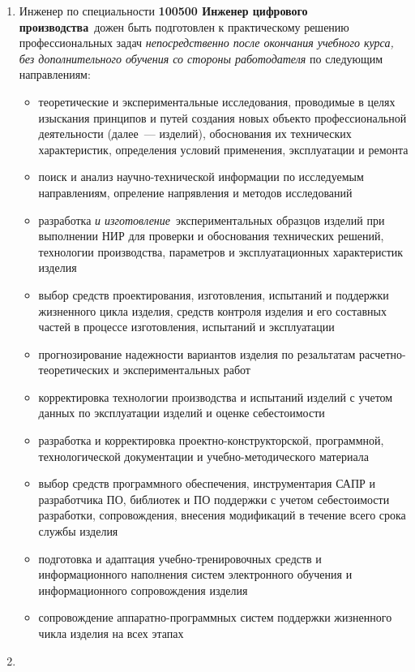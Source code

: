 \begin{enumerate}
  \item Инженер по специальности \textbf{100500 Инженер цифрового производства}\
  дожен быть подготовлен к практическому решению профессиональных задач
  \emph{непосредственно после окончания учебного курса, без дополнительного
  обучения со стороны работодателя} по следующим направлениям:
  \begin{itemize}[nosep]
    \item теоретические и экспериментальные исследования, проводимые в целях
    изыскания принципов и путей создания новых объекто профессиональной
    деятельности (далее\ --- изделий), обоснования их технических характеристик,
    определения условий применения, эксплуатации и ремонта
    \item поиск и анализ научно-технической информации по исследуемым
    направлениям, опреление напрявления и методов исследований
    \item разработка \emph{и изготовление}\ экспериментальных образцов изделий
    при выполнении НИР для проверки и обоснования технических решений,
    технологии производства, параметров и эксплуатационных характеристик изделия
    \item выбор средств проектирования, изготовления, испытаний и поддержки
    жизненного цикла изделия, средств контроля изделия и его составных частей в
    процессе изготовления, испытаний и эксплуатации
    \item прогнозирование надежности вариантов изделия по резальтатам
    расчетно-теоретических и экспериментальных работ
    \item корректировка технологии производства и испытаний изделий с учетом
    данных по эксплуатации изделий и оценке себестоимости
    \item разработка и корректировка проектно-конструкторской, программной,
    технологической документации и учебно-методического материала
    \item выбор средств программного обеспечения, инструментария САПР и
    разработчика ПО, библиотек и ПО поддержки с учетом себестоимости разработки,
    сопровождения, внесения модификаций в течение всего срока службы изделия
    \item подготовка и адаптация учебно-тренировочных средств и информационного
    наполнения систем электронного обучения и информационного сопровождения
    изделия
    \item сопровождение аппаратно-программных систем поддержки жизненного чикла
    изделия на всех этапах
     
  \end{itemize}
  
  \item 
	  
    
\end{enumerate}